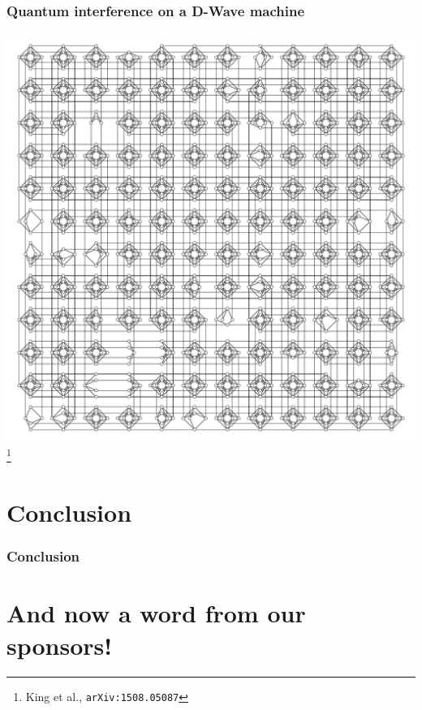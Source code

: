 \documentclass[]{beamer}
\begin{document}
\begin{frame}
\frametitle{Quantum interference on a D-Wave machine}
\begin{center}
\includegraphics[scale=0.25]{dwave2x}\footnote{King et al., {\tt arXiv:1508.05087}}
\end{center}
\end{frame}

\section{Conclusion}

\begin{frame}
\frametitle{Conclusion}



\end{frame}

\section{And now a word from our sponsors!}
\end{document}
